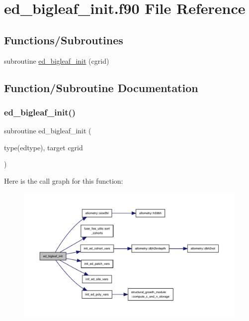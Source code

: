 \hypertarget{ed__bigleaf__init_8f90}{}\section{ed\+\_\+bigleaf\+\_\+init.\+f90 File Reference}
\label{ed__bigleaf__init_8f90}
\subsection*{Functions/\+Subroutines}
\begin{DoxyCompactItemize}
\item 
subroutine \hyperlink{ed__bigleaf__init_8f90_a1e7ca0536a5eed8f8eaee3c6271bcbde}{ed\+\_\+bigleaf\+\_\+init} (cgrid)
\end{DoxyCompactItemize}


\subsection{Function/\+Subroutine Documentation}
\mbox{\label{ed__bigleaf__init_8f90_a1e7ca0536a5eed8f8eaee3c6271bcbde}} 
\subsubsection{\texorpdfstring{ed\+\_\+bigleaf\+\_\+init()}{ed\_bigleaf\_init()}}
{\footnotesize\ttfamily subroutine ed\+\_\+bigleaf\+\_\+init (\begin{DoxyParamCaption}\item[{type(edtype), target}]{cgrid }\end{DoxyParamCaption})}

Here is the call graph for this function\+:
\nopagebreak
\begin{figure}[H]
\begin{center}
\leavevmode
\includegraphics[width=350pt]{ed__bigleaf__init_8f90_a1e7ca0536a5eed8f8eaee3c6271bcbde_cgraph}
\end{center}
\end{figure}
